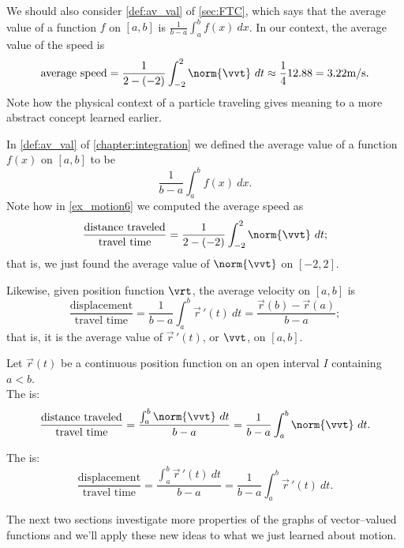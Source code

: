 {\begin{enumerate}
	{%
	}%
	We should also consider \autoref{def:av_val} of \autoref{sec:FTC}, which says that the average value of a function $f$ on $[a,b]$ is $\frac{1}{b-a}\int_a^b f(x)\ dx$. In our context, the average value of the speed is
	$$\text{average speed} = \frac{1}{2-(-2)}\int_{-2}^2 \norm{\vvt}\ dt \approx \frac14 12.88 = 3.22\text{m/s}.$$
	Note how the physical context of a particle traveling gives meaning to a more abstract concept learned earlier.
\end{enumerate}}

In \autoref{def:av_val} of \autoref{chapter:integration} we defined the average value of a function $f(x)$ on $[a,b]$ to be $$ \frac{1}{b-a}\int_a^bf(x)\ dx.$$
Note how in \autoref{ex_motion6} we computed the average speed as
$$\frac{\text{distance traveled}}{\text{travel time}} = \frac1{2-(-2)}\int_{-2}^2\norm{\vvt}\ dt;$$
that is, we just found the average value of $\norm{\vvt}$ on $[-2,2]$.

Likewise, given position function $\vrt$, the average velocity on $[a,b]$ is
$$\frac{\text{displacement}}{\text{travel time}} = \frac1{b-a}\int_a^b \vec{r}\,'(t)\ dt = \frac{\vec r(b)-\vec r(a)}{b-a};$$
that is, it is the average value of $\vec r\,'(t)$, or $\vvt$, on $[a,b]$.\\

{Let $\vec r(t)$ be a continuous position function on an open interval $I$ containing $a<b$. \\

The  is:
$$\frac{\text{distance traveled}}{\text{travel time}} = \frac{\int_a^b \norm{\vvt}\ dt}{b-a} = \frac1{b-a}\int_a^b\norm{\vvt}\ dt.$$

The  is:
$$\frac{\text{displacement}}{\text{travel time}} = \frac{\int_a^b \vec{r}\,'(t)\ dt}{b-a} = \frac1{b-a}\int_a^b\vec{r}\,'(t)\ dt.$$}

The next two sections investigate more properties of the graphs of vector--valued functions and we'll apply these new ideas to what we just learned about motion.

